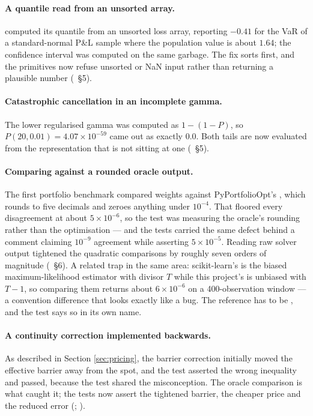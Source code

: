 \documentclass[11pt,a4paper]{article}
\begin{document}
\paragraph{A quantile read from an unsorted array.}  computed its
quantile from an unsorted loss array, reporting $-0.41$ for the VaR of a standard-normal
P\&L sample where the population value is about $1.64$; the confidence interval was computed
on the same garbage. The fix sorts first, and the  primitives now refuse
unsorted or NaN input rather than returning a plausible number
(~\S5).

\paragraph{Catastrophic cancellation in an incomplete gamma.} The lower regularised gamma was
computed as $1 - (1 - P)$, so $P(20, 0.01) = 4.07\times 10^{-59}$ came out as exactly 0.0. Both
tails are now evaluated from the representation that is not sitting at one
(~\S5).

\paragraph{Comparing against a rounded oracle output.} The first portfolio benchmark compared
weights against PyPortfolioOpt's , which rounds to five decimals and
zeroes anything under $10^{-4}$. That floored every disagreement at about $5\times 10^{-6}$, so
the test was measuring the oracle's rounding rather than the optimisation --- and the tests
carried the same defect behind a comment claiming $10^{-9}$ agreement while asserting
$5\times 10^{-5}$. Reading raw solver output tightened the quadratic comparisons by roughly
seven orders of magnitude (~\S6).
A related trap in the same area: scikit-learn's  is the biased
maximum-likelihood estimator with divisor $T$ while this project's is unbiased with $T-1$, so
comparing them returns about $6\times 10^{-6}$ on a 400-observation window --- a convention
difference that looks exactly like a bug. The reference has to be , and
the test says so in its own name.

\paragraph{A continuity correction implemented backwards.} As described in
Section \ref{sec:pricing}, the barrier correction initially moved the effective barrier away
from the spot, and the test asserted the wrong inequality and passed, because the test shared
the misconception. The oracle comparison is what caught it; the tests now assert the tightened
barrier, the cheaper price and the reduced error
(;
).
\end{document}
